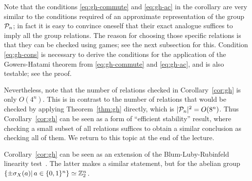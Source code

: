 Note that the conditions \eqref{eq:gh-commute} and \eqref{eq:gh-ac} in the corollary are very similar to the conditions required of an approximate representation of the group $\mathcal{P}_n$; in fact it is easy to convince oneself that their exact analogue suffices to imply all the group relations. The reason for choosing those specific relations is that they can be checked using games; see the next subsection for this. Condition \eqref{eq:gh-cons} is necessary to derive the conditions for the application of the Gowers-Hatami theorem from \eqref{eq:gh-commute} and \eqref{eq:gh-ac}, and is also testable; see the proof. 

Nevertheless, note that the number of relations checked in Corollary~\ref{cor:gh} is only $O(4^n)$. This is in contrast to the number of relations that would be checked by applying Theorem~\ref{thm:gh} directly, which is $|\mathcal{P}_n|^2=O(8^n)$. Thus Corollary~\ref{cor:gh} can be seen as a form of ``efficient stability'' result, where checking a small subset of all relations suffices to obtain a similar conclusion as checking all of them. We return to this topic at the end of the lecture. 



\begin{remark}
Corollary~\ref{cor:gh} can be seen as an extension of the Blum-Luby-Rubinfeld linearity test~\cite{blum1993self}. The latter makes a similar statement, but for the abelian group $\{\pm\sigma_X(a)|\, a\in\{0,1\}^n\} \simeq \mathbb{Z}_2^n$. 
\end{remark}


